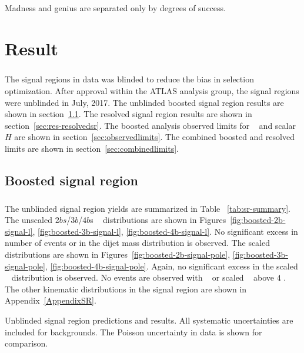 \begin{savequote}[75mm]
Madness and genius are separated only by degrees of success. 
\end{savequote}

\chapter{Result}
\paragraph{}
The signal regions in data was blinded to reduce the bias in selection optimization.
After approval within the ATLAS analysis group, the signal regions were unblinded in July, 2017.
The unblinded boosted signal region results are shown in section~\ref{sec:res-boostedsr}.
The resolved signal region results are shown in section~\ref{sec:res-resolvedsr}.
The boosted analysis observed limits for \Grav~ and scalar $H$ are shown in section~\ref{sec:observedlimits}.
The combined boosted and resolved limits are shown in section~\ref{sec:combinedlimits}.

\section{Boosted signal region}
\label{sec:res-boostedsr}
\paragraph{}
The unblinded signal region yields are summarized in Table ~\ref{tab:sr-summary}. 
The unscaled $2bs$/$3b$/$4b$s \mtwoJ~ distributions are shown in Figures~\ref{fig:boosted-2b-signal-l}, \ref{fig:boosted-3b-signal-l}, \ref{fig:boosted-4b-signal-l}. 
No significant excess in number of events or in the dijet mass distribution is observed.
The scaled \mtwoJ~ distributions are shown in Figures~\ref{fig:boosted-2b-signal-pole}, \ref{fig:boosted-3b-signal-pole}, \ref{fig:boosted-4b-signal-pole}. 
Again, no significant excess in the scaled \mtwoJ~ distribution is observed.
No events are observed with \mtwoJ~ or scaled \mtwoJ~ above $4$ \TeV.
The other kinematic distributions in the signal region are shown in Appendix~\ref{AppendixSR}.

\begin{table}[htb!]
\scriptsize
\begin{center}
\caption{Unblinded signal region predictions and results. All systematic uncertainties are included for backgrounds. The Poisson uncertainty in data is shown for comparison.}

\label{tab:sr-summary}
\end{center}
\end{table}

